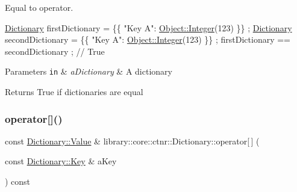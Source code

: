 Equal to operator. 


\begin{DoxyCode}
\hyperlink{classlibrary_1_1core_1_1ctnr_1_1_dictionary_a823a08112d9ee271f9fa5833f030ea1a}{Dictionary} firstDictionary = \{\{ \textcolor{stringliteral}{"Key A"}: \hyperlink{classlibrary_1_1core_1_1ctnr_1_1_object_a8a8b1ef718d092c154011cf5c37373bb}{Object::Integer}(123) \}\} ;
\hyperlink{classlibrary_1_1core_1_1ctnr_1_1_dictionary_a823a08112d9ee271f9fa5833f030ea1a}{Dictionary} secondDictionary = \{\{ \textcolor{stringliteral}{"Key A"}: \hyperlink{classlibrary_1_1core_1_1ctnr_1_1_object_a8a8b1ef718d092c154011cf5c37373bb}{Object::Integer}(123) \}\} ;
firstDictionary == secondDictionary ; \textcolor{comment}{// True}
\end{DoxyCode}



\begin{DoxyParams}[1]{Parameters}
\mbox{\tt in}  & {\em a\+Dictionary} & A dictionary \\
\hline
\end{DoxyParams}
\begin{DoxyReturn}{Returns}
True if dictionaries are equal 
\end{DoxyReturn}
\mbox{\label{classlibrary_1_1core_1_1ctnr_1_1_dictionary_a19aebb248967d9e887b6926fe0df033e}} 
\subsubsection{\texorpdfstring{operator[]()}{operator[]()}\hspace{0.1cm}{\footnotesize\ttfamily [1/2]}}
{\footnotesize\ttfamily const \hyperlink{classlibrary_1_1core_1_1ctnr_1_1_dictionary_a3baf6692694e4fc27cb399ac083c88ea}{Dictionary\+::\+Value} \& library\+::core\+::ctnr\+::\+Dictionary\+::operator\mbox{[}$\,$\mbox{]} (\begin{DoxyParamCaption}\item[{const \hyperlink{classlibrary_1_1core_1_1ctnr_1_1_dictionary_a987cae687cce70d81a2a483c5e05e842}{Dictionary\+::\+Key} \&}]{a\+Key }\end{DoxyParamCaption}) const}



